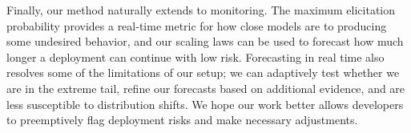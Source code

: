 Finally, our method naturally extends to monitoring. The maximum elicitation probability provides a real-time metric for how close models are to producing some undesired behavior, and our scaling laws can be used to forecast how much longer a deployment can continue with low risk. 
Forecasting in real time also resolves some of the limitations of our setup; we can adaptively test whether we are in the extreme tail, refine our forecasts based on additional evidence, and are less susceptible to distribution shifts. 
We hope our work better allows developers to preemptively flag deployment risks and make necessary adjustments. 